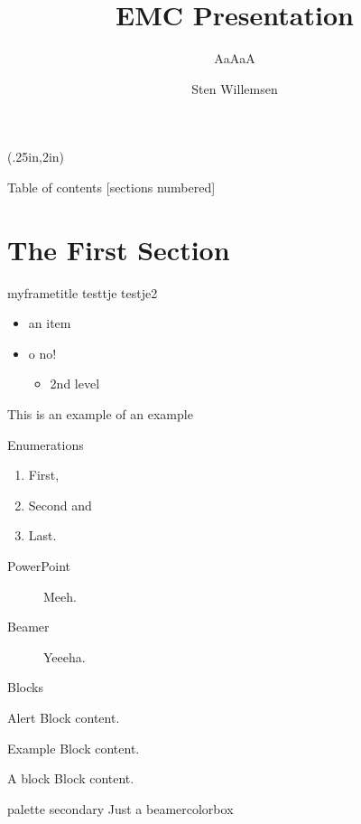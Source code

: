 \documentclass[12pt, dutch]{beamer}
\author{Sten Willemsen}
\title{EMC Presentation}
\subtitle{AaAaA}
\begin{document}
\begin{frame}
	\titlepage
\begin{textblock*}{\textwidth}(.25in,2in)
\end{textblock*} 
\end{frame}


\begin{frame}{Table of contents}
  [sections numbered]
  \tableofcontents[hideallsubsections]
\end{frame}

\section{The First Section}

\begin{frame}{myframetitle}
testtje
testje2
\begin{itemize}
\item an item
\item o \alert{no}!
\begin{itemize}
\item 2nd level
\end{itemize}
\end{itemize}
\begin{example}[An example]
This is an example of an example
\end{example}
\end{frame}

\begin{frame}{Enumerations}
      \begin{enumerate}
        \item First, \item Second and \item Last.
      \end{enumerate}
       \begin{description}
        \item[PowerPoint] Meeh. \item[Beamer] Yeeeha.
      \end{description}
\end{frame}

\begin{frame}{Blocks}
    \begin{alertblock}{Alert}
        Block content.
      \end{alertblock}
      \begin{exampleblock}{Example}
        Block content.
       \end{exampleblock} 
      \begin{block}{A block}
        Block content.
       \end{block}        
\begin{beamercolorbox}[wd=\linewidth,ht=2.5ex,dp=1.125ex,center]{palette secondary}
Just a beamercolorbox
\end{beamercolorbox}
           
\end{frame}
\end{document}
